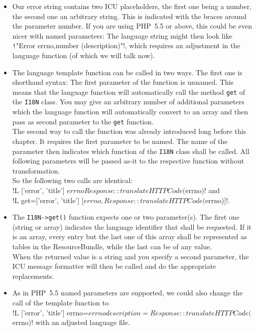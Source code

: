 \documentclass{scrartcl}
\begin{document}
      \begin{itemize}
         \item
            Our error string contains two ICU placeholders, the first one being a number, the second one an arbitrary string. This is indicated with the braces around the parameter number. If you are using PHP~5.5 or above, this could be even nicer with named parameters: The language string might then look like \texttt!"Error {errno,number} ({description})"!, which requires an adjustment in the language function (of which we will talk now).
         \item \label{tf2}
            The language template function can be called in two ways. The first one is shorthand syntax: The first parameter of the function is unnamed. This means that the language function will automatically call the method \lstinline!get! of the \lstinline!I18N! class. You may give an arbitrary number of additional parameters which the language function will automatically convert to an array and then pass as second parameter to the \lstinline!get! function. \\
            The second way to call the function was already introduced long before this chapter. It requires the first parameter to be named. The name of the parameter then indicates which function of the \lstinline!I18N! class shall be called. All following parameters will be passed as-it to the respective function without transformation. \\
            So the following two calls are identical: \\
            \smarty!{L ['error', 'title'] $errno Response::translateHTTPCode($errno)}! and \\
            \smarty!{L get=['error', 'title'] [$errno, Response::translateHTTPCode($errno)]}!.
         \item
            The \lstinline!I18N->get()! function expects one or two parameter(s). The first one (string or array) indicates the language identifier that shall be requested. If it is an array, every entry but the last one of this array shall be represented as tables in the ResourceBundle, while the last can be of any value. \\
            When the returned value is a string and you specify a second parameter, the ICU message formatter will then be called and do the appropriate replacements.
         \item
            As in PHP~5.5 named parameters are supported, we could also change the call of the template function to \\
            \smarty!{L ['error', 'title'] errno=$errno description=Response::translateHTTPCode($errno)}! with an adjusted language file.
      \end{itemize}
\end{document}
